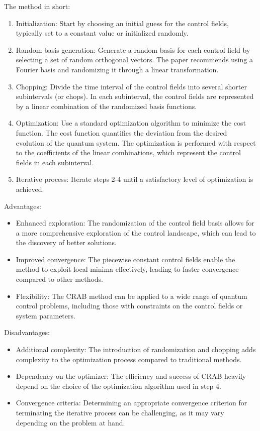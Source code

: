 The method in short:
\begin{enumerate}
    \item Initialization: Start by choosing an initial guess for the control fields, typically set to a constant value or initialized randomly.
    \item Random basis generation: Generate a random basis for each control field by selecting a set of random orthogonal vectors. The paper recommends using a Fourier basis and randomizing it through a linear transformation.
    \item Chopping: Divide the time interval of the control fields into several shorter subintervals (or chops). In each subinterval, the control fields are represented by a linear combination of the randomized basis functions.
    \item Optimization: Use a standard optimization algorithm to minimize the cost function. The cost function quantifies the deviation from the desired evolution of the quantum system. The optimization is performed with respect to the coefficients of the linear combinations, which represent the control fields in each subinterval.
    \item Iterative process: Iterate steps 2-4 until a satisfactory level of optimization is achieved.
\end{enumerate}

Advantages:

\begin{itemize}
    \item Enhanced exploration: The randomization of the control field basis allows for a more comprehensive exploration of the control landscape, which can lead to the discovery of better solutions.
    \item Improved convergence: The piecewise constant control fields enable the method to exploit local minima effectively, leading to faster convergence compared to other methods.
    \item Flexibility: The CRAB method can be applied to a wide range of quantum control problems, including those with constraints on the control fields or system parameters.
\end{itemize}

Disadvantages:

\begin{itemize}
    \item Additional complexity: The introduction of randomization and chopping adds complexity to the optimization process compared to traditional methods.
    \item Dependency on the optimizer: The efficiency and success of CRAB heavily depend on the choice of the optimization algorithm used in step 4.
    \item Convergence criteria: Determining an appropriate convergence criterion for terminating the iterative process can be challenging, as it may vary depending on the problem at hand.
\end{itemize}

